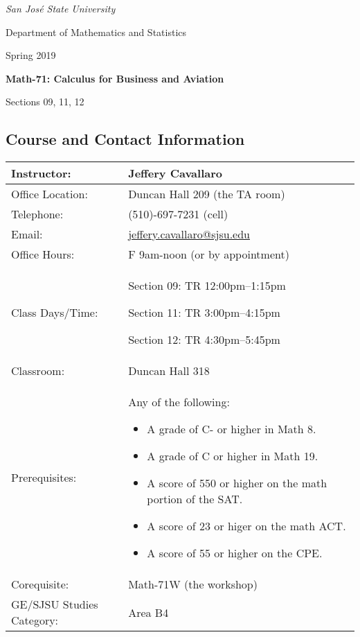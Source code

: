 \documentclass[letterpaper,12pt,fleqn]{article}
\begin{document}
\begin{center}
  \emph{San Jos\'{e} State University}

  Department of Mathematics and Statistics

  {\large Spring 2019}
  
  \begin{Large}
    \bfseries
    Math-71: Calculus for Business and Aviation

    Sections 09, 11, 12
  \end{Large}
\end{center}

\vspace{0.25in}

\subsection*{Course and Contact Information}

\begin{tabular}{|p{2in}|p{4.5in}|}
  \hline
  Instructor: & Jeffery Cavallaro \\
  \hline
  Office Location: & Duncan Hall 209 (the TA room) \\
  \hline
  Telephone: & (510)-697-7231 (cell) \\
  \hline
  Email: & \url{jeffery.cavallaro@sjsu.edu} \\
  \hline
  Office Hours: & F 9am-noon (or by appointment) \\
  \hline
  Class Days/Time: & \begin{minipage}{4.5in}
    \vspace{0.1cm}
    Section 09: TR 12:00pm--1:15pm
    
    Section 11: TR 3:00pm--4:15pm
    
    Section 12: TR 4:30pm--5:45pm
    \vspace{0.1cm}
  \end{minipage} \\
  \hline
  Classroom: & Duncan Hall 318 \\
  \hline
  Prerequisites: & \begin{minipage}{4.5in}
    \vspace{0.1cm}
    Any of the following:
    \begin{itemize}
    \item A grade of C- or higher in Math 8.
    \item A grade of C or higher in Math 19.
    \item A score of 550 or higher on the math portion of the SAT.
    \item A score of 23 or higer on the math ACT.
    \item A score of 55 or higher on the CPE.
    \end{itemize}
    \vspace{0.1cm}
  \end{minipage} \\
  \hline
  Corequisite: & Math-71W (the workshop) \\
  \hline
  GE/SJSU Studies Category: & Area B4 \\
  \hline
\end{tabular}
\end{document}

